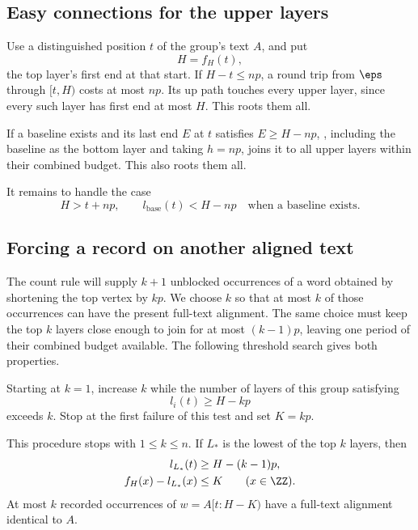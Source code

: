 \subsection{Easy connections for the upper layers}

Use a distinguished position $t$ of the group's text $A$, and put
\[
H=f_H(t),
\]
the top layer's first end at that start. If $H-t\le np$, a round trip from $\eps$ through $[t,H)$ costs at most $np$. Its up path touches every upper layer, since every such layer has first end at most $H$. This roots them all.

If a baseline exists and its last end $E$ at $t$ satisfies $E\ge H-np$, , including the baseline as the bottom layer and taking $h=np$, joins it to all upper layers within their combined budget. This also roots them all.

It remains to handle the case
\begin{equation}\label{eq:hard-case}
H>t+np,
\qquad l_{\mathrm{base}}(t)<H-np
\quad\text{when a baseline exists}.
\end{equation}

\subsection{Forcing a record on another aligned text}

The count rule will supply $k+1$ unblocked occurrences of a word obtained by shortening the top vertex by $kp$. We choose $k$ so that at most $k$ of those occurrences can have the present full-text alignment. The same choice must keep the top $k$ layers close enough to join for at most $(k-1)p$, leaving one period of their combined budget available. The following threshold search gives both properties.

Starting at $k=1$, increase $k$ while the number of layers of this group satisfying
\[
l_i(t)\ge H-kp
\]
exceeds $k$. Stop at the first failure of this test and set $K=kp$.

\begin{lemma}\label{lem:choose-k}
This procedure stops with $1\le k\le n$. If $L_*$ is the lowest of the top $k$ layers, then
\begin{align}
l_{L_*}(t)&\ge H-(k-1)p,\label{eq:sharp-band}\\
f_H(x)-l_{L_*}(x)&\le K\qquad(x\in\ZZ).\label{eq:wide-band}
\end{align}
At most $k$ recorded occurrences of $w=A[t:H-K)$ have a full-text alignment identical to $A$.
\end{lemma}

